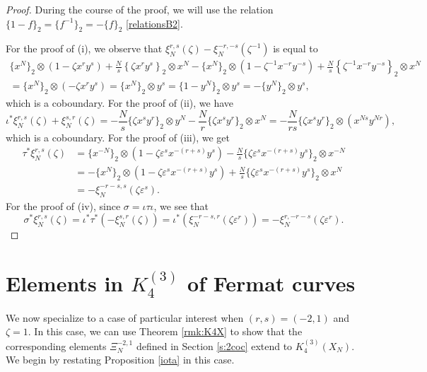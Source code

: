 \documentclass[11pt,a4,leqno]{amsart}
\theoremstyle{my theoremstyle}
\theoremstyle{dfn}
\theoremstyle{remark}
\renewcommand{\1}{\mathbbm{1}}
\newcommand{\e}{\varepsilon}
\newcommand{\z}{\zeta}
\numberwithin{equation}{section}
\begin{document}
\begin{proof}
During the course of the proof, we will use the relation 
$\{1-f\}_2=\{f^{-1}\}_2=-\{f\}_2$ \eqref{relationsB2}.

For the proof of (i), we observe that $\xi^{r, s}_N(\zeta)-\xi^{-r, -s}_N(\z^{-1})$ is equal to
\begin{multline*}
\{x^N\}_2 \otimes \left(1- \z {x^r}{y^s} \right) + \frac{N}s\left\{\z {x^r}{y^s}\right\}_2 \otimes x^N  - 
\{x^N\}_2 \otimes \left(1- \z^{-1} {x^{-r}}{y^{-s}} \right) +  \frac{N}s\left\{\z^{-1} {x^{-r}}{y^{-s}}\right\}_2 \otimes x^N \\
 = \{x^N \}_2 \otimes \left(- \z {x^r} y^s \right) 
=\{x^N\}_2 \otimes y^s = \{1-y^N\}_2 \otimes y^s 
= -\{y^N\}_2 \otimes y^s, 
\end{multline*}
which is a coboundary. 
For the proof of (ii), we have 
\begin{equation*}
\iota^* \xi^{r, s}_N(\zeta)+  \xi^{s, r}_N(\zeta) = - \frac{N}{s} \{\z x^s y^r\}_2 \otimes y^N - \frac{N}{r} \{\z x^s y^r \}_2 \otimes x^N = - \frac{N}{rs} \{\z x^s y^r\}_2 \otimes (x^{Ns} y^{Nr}), 
\end{equation*}
which is a coboundary. 
For the proof of (iii), we get
\begin{align*}
 \tau^* \xi^{r, s}_N(\zeta) & =  \{x^{-N}\}_2 \otimes (1- \z\varepsilon^s x^{-(r+s)} y^s) - \frac{N}{s} \{\z\varepsilon^s x^{-(r+s)} y^s\}_2 \otimes x^{-N} \\
 & =  -\{x^{N}\}_2 \otimes (1- \z\varepsilon^s x^{-(r+s)} y^s) + \frac{N}{s} \{\z\varepsilon^s x^{-(r+s)} y^s\}_2 \otimes x^{N} \\
 & = - \xi^{-r-s, s}_N(\z \e^s).
\end{align*}
For the proof of (iv), since $\sigma=\iota \tau \iota$, we see that
\begin{equation*}
 \sigma^* \xi^{r, s}_N(\zeta) =\iota^* \tau^* (-  \xi^{s, r}_N(\zeta))=\iota^*(\xi^{-r-s, r}_N(\z \e^r))=-\xi^{r, -r-s}_N(\z \e^r).
\end{equation*}
\end{proof} 

\section{Elements in $K_4^{(3)}$ of Fermat curves} \label{sec:elements}
We now specialize to a case of particular interest when $(r,s)=(-2,1)$ and $\zeta=1$. In this case, we can use Theorem \ref{rmk:K4X} to show that the corresponding elements $\Xi_N^{-2,1}$ defined in Section \ref{s:2coc} extend to $K_4^{(3)}(X_N)$. We begin by restating Proposition \ref{iota} in this case.
\end{document}
